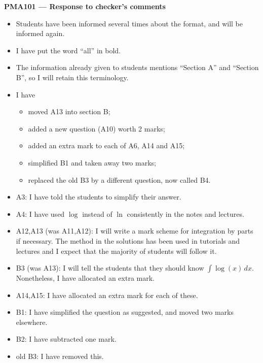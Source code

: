 \documentclass{amsart}
\begin{document}
\begin{center}
 {\Large\bf PMA101 --- Response to checker's comments}
\end{center}

\begin{itemize}
 \item Students have been informed several times about the format, and
  will be informed again.
 \item I have put the word ``all'' in bold.
 \item The information already given to students mentions ``Section
  A'' and ``Section B'', so I will retain this terminology.
 \item I have 
  \begin{itemize}
   \item moved A13 into section B;
   \item added a new question (A10) worth 2 marks;
   \item added an extra mark to each of A6, A14 and A15;
   \item simplified B1 and taken away two marks;
   \item replaced the old B3 by a different question, now called B4.
  \end{itemize}
 \item A3: I have told the students to simplify their answer. 
 \item A4: I have used $\log$ instead of $\ln$ consistently in the
  notes and lectures.
 \item A12,A13 (was A11,A12): I will write a mark scheme for
  integration by parts if necessary.  The method in the solutions has
  been used in tutorials and lectures and I expect that the majority
  of students will follow it.
 \item B3 (was A13): I will tell the students that they should know
  $\int\log(x)\,dx$.  Nonetheless, I have allocated an extra mark.
 \item A14,A15: I have allocated an extra mark for each of these.
 \item B1: I have simplified the question as suggested, and moved two
  marks elsewhere.
 \item B2: I have subtracted one mark.
 \item old B3: I have removed this.
\end{itemize}


\end{document}
